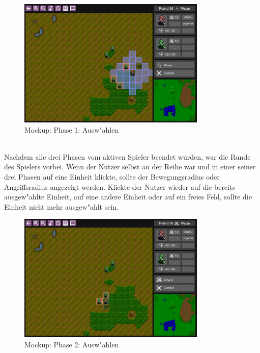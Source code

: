 \documentclass[12pt, titlepage]{scrartcl}
\begin{document}
			        \begin{figure}[H] 
    				    \centering
    				    \includegraphics[width=0.8\textwidth]{images/mockups/Select.png}
    				    \caption{Mockup: Phase 1: Ausw"ahlen}
    				    \label{Select_1}
			        \end{figure}
			        \ \\ Nachdem alle drei Phasen vom aktiven Spieler beendet wurden, war die Runde des Spielers vorbei. Wenn der Nutzer selbst an der Reihe war und in einer seiner drei Phasen auf eine Einheit klickte, sollte der Bewegungsradius oder Angriffsradius angezeigt werden. Klickte der Nutzer wieder auf die bereits ausgew"ahlte Einheit, auf eine andere Einheit oder auf ein freies Feld, sollte die Einheit nicht mehr ausgew"ahlt sein. \\
                    \begin{figure}[H] 
    				    \centering
    				    \includegraphics[width=0.8\textwidth]{images/mockups/Select3.png}
    				    \caption{Mockup: Phase 2: Ausw"ahlen}
    				    \label{Select_2}
			        \end{figure} 
\end{document}
